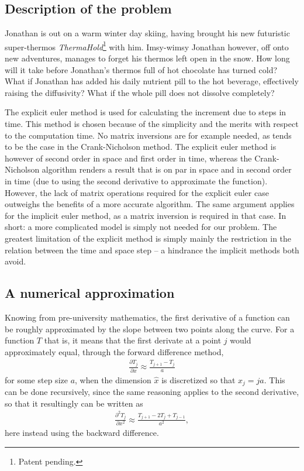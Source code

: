\documentclass[a4paper,12pt]{article}
\theoremstyle{plain}
\theoremstyle{definition}
\begin{document}
   \subsection{Description of the problem}
      Jonathan is out on a warm winter day skiing, having brought his new
      futuristic super-thermos \emph{ThermaHold\texttrademark}\hspace{2pt}\footnote{Patent
      pending.} with him. Imsy-wimsy Jonathan however, off onto new adventures, 
      manages to forget his thermos left open in the snow. How long will it take before 
      Jonathan's thermos full of hot chocolate has turned cold? What if Jonathan
      has added his daily nutrient pill to the hot beverage, effectively raising
      the diffusivity? What if the whole pill does not dissolve completely? 

      The explicit euler method is used for calculating the increment due to
      steps in time. This method is chosen because of the simplicity and the
      merits with respect to the computation time. No matrix inversions are for
      example needed, as tends to be the case in the Crank-Nicholson method. The
      explicit euler method is however of second order in space and first order
      in time, whereas the Crank-Nicholson algorithm renders a result that is on
      par in space and in second order in time (due to using the second
      derivative to approximate the function). However, the lack of matrix operations
      required for the explicit euler case outweighs the benefits of a more
      accurate algorithm. The same argument applies for the implicit euler
      method, as a matrix inversion is required in that case. In short: a more
      complicated model is simply not needed for our problem. The greatest limitation 
      of the explicit method is simply mainly the restriction in the
      relation between the time and space step -- a hindrance the implicit
      methods both avoid. 
      
   
   \subsection{A numerical approximation}
      Knowing from pre-university mathematics, the first derivative of a
      function can be roughly approximated by the slope between two points along
      the curve. For a function $T$ that is, it means that the first derivate
      at a point $j$ would approximately equal, through the forward difference
      method, 
         \begin{align}
            \frac{\partial T_{j}}{\partial x} \approx \frac{T_{j+1} - T_j}{a}
            \label{eq:first_der}
         \end{align}
      for some step size $a$, when the dimension $\hat x$ is discretized so that
      $x_j = ja$. This can be done recursively, since the same reasoning applies
      to the second derivative, so that it resultingly can be written as
         \begin{align}
            \frac{\partial^2 T_{j}}{\partial x^2} \approx \frac{T_{j+1} - 2T_j + T_{j-1}}{a^2},
            \label{eq:second_der}
         \end{align}
      here instead using the backward difference.
   
\end{document}
